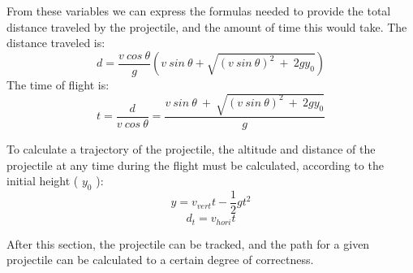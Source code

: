 From these variables we can express the formulas needed to provide the total distance traveled by the projectile, and the amount of time this would take.\newline
The distance traveled is:
\[d = \dfrac{v \ cos \ \theta}{g}(v \ sin \ \theta + \sqrt{(v \ sin \ \theta)^2 \ + \ 2gy_{0}})\] \newline
The time of flight is:
\[t = \dfrac{d}{v \ cos \ \theta} = \dfrac{v \ sin \ \theta \ + \ \sqrt{(v \ sin \ \theta)^2 \ + \ 2gy_{0}}}{g}\]
\newline

To calculate a trajectory of the projectile, the altitude and distance of the projectile at any time during the flight must be calculated, according to the initial height ( \(y_{0}\) ):
\[y = v_{vert}t - \dfrac{1}{2} gt^2\]
\[d_{t} = v_{hori}t\]

After this section, the projectile can be tracked, and the path for a given projectile can be calculated to a certain degree of correctness. 